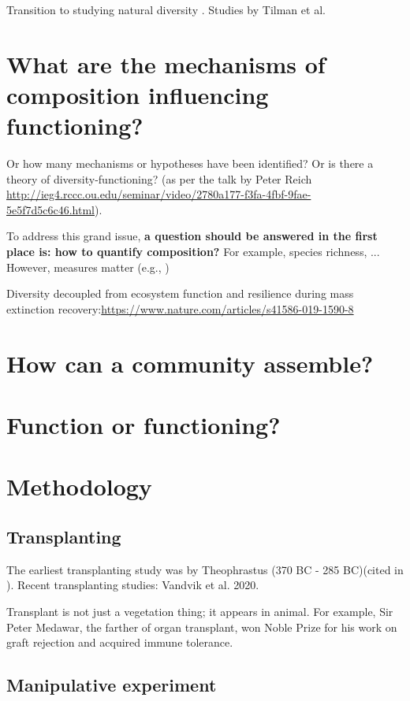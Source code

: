 \documentclass[letterpaper, 10pt]{article}
\begin{document}
Transition to studying natural diversity \citep{levin1999fragile}. Studies by Tilman et al. 


\section{What are the mechanisms of composition influencing functioning?}
Or how many mechanisms or hypotheses have been identified? Or is there a theory of diversity-functioning? (as per the talk by Peter Reich \url{http://ieg4.rccc.ou.edu/seminar/video/2780a177-f3fa-4fbf-9fae-5e5f7d5c6c46.html}). 

To address this grand issue, \textbf{a question should be answered in the first place is: how to quantify composition?} For example, species richness, ... However, measures matter (e.g., \citealp{schuldt2017belowground})


Diversity decoupled from ecosystem function and resilience during mass extinction recovery:\url{https://www.nature.com/articles/s41586-019-1590-8}


\section{How can a community assemble?}


\section{Function or functioning?}

\section{Methodology}

\subsection{Transplanting}
The earliest transplanting study was by Theophrastus (370 BC - 285 BC)(cited in \citet{woodward1987climate}). Recent
transplanting studies: Vandvik et al. 2020\citep{vandvik2020biotic}.

Transplant is not just a vegetation thing; it appears in animal. For example, Sir Peter Medawar, the farther of
organ transplant, won Noble Prize for his work on graft rejection and acquired immune tolerance.

\subsection{Manipulative experiment}




\end{document}
